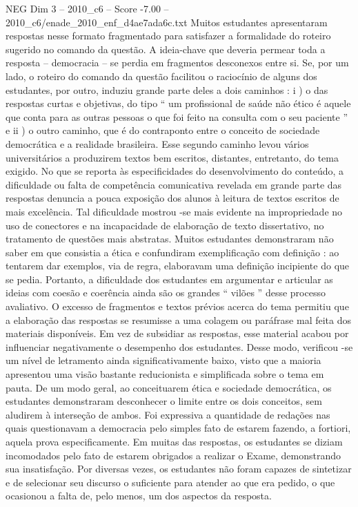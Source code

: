 \begin{textsample}{NEG Dim 3 – 2010\_c6 – Score -7.00 – 2010\_c6/enade\_2010\_enf\_d4ae7ada6c.txt}
Muitos estudantes apresentaram respostas nesse formato fragmentado para satisfazer a formalidade do roteiro sugerido no comando da questão.
A ideia-chave que deveria permear toda a resposta – democracia – se perdia em fragmentos desconexos entre si.
Se, por um lado, o roteiro do comando da questão facilitou o raciocínio de alguns dos estudantes, por outro, induziu grande parte deles a dois caminhos : i ) o das respostas curtas e objetivas, do tipo “ um profissional de saúde não ético é aquele que conta para as outras pessoas o que foi feito na consulta com o seu paciente ” e ii ) o outro caminho, que é do contraponto entre o conceito de sociedade democrática e a realidade brasileira.
Esse segundo caminho levou vários universitários a produzirem textos bem escritos, distantes, entretanto, do tema exigido.
No que se reporta às especificidades do desenvolvimento do conteúdo, a dificuldade ou falta de competência comunicativa revelada em grande parte das respostas denuncia a pouca exposição dos alunos à leitura de textos escritos de mais excelência.
Tal dificuldade mostrou -se mais evidente na impropriedade no uso de conectores e na incapacidade de elaboração de texto dissertativo, no tratamento de questões mais abstratas.
Muitos estudantes demonstraram não saber em que consistia a ética e confundiram exemplificação com definição : ao tentarem dar exemplos, via de regra, elaboravam uma definição incipiente do que se pedia.
Portanto, a dificuldade dos estudantes em argumentar e articular as ideias com coesão e coerência ainda são os grandes “ vilões ” desse processo avaliativo.
O excesso de fragmentos e textos prévios acerca do tema permitiu que a elaboração das respostas se resumisse a uma colagem ou paráfrase mal feita dos materiais disponíveis.
Em vez de subsidiar as respostas, esse material acabou por influenciar negativamente o desempenho dos estudantes.
Desse modo, verificou -se um nível de letramento ainda significativamente baixo, visto que a maioria apresentou uma visão bastante reducionista e simplificada sobre o tema em pauta.
De um modo geral, ao conceituarem ética e sociedade democrática, os estudantes demonstraram desconhecer o limite entre os dois conceitos, sem aludirem à interseção de ambos.
Foi expressiva a quantidade de redações nas quais questionavam a democracia pelo simples fato de estarem fazendo, a fortiori, aquela prova especificamente.
Em muitas das respostas, os estudantes se diziam incomodados pelo fato de estarem obrigados a realizar o Exame, demonstrando sua insatisfação.
Por diversas vezes, os estudantes não foram capazes de sintetizar e de selecionar seu discurso o suficiente para atender ao que era pedido, o que ocasionou a falta de, pelo menos, um dos aspectos da resposta.

\end{textsample}
